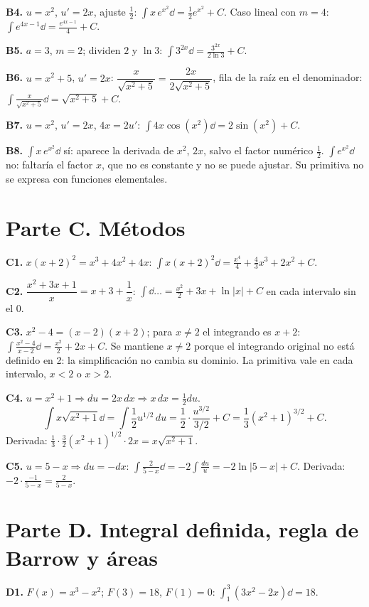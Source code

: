 \documentclass[11pt]{article}
\begin{document}
\textbf{B4.} \(u=x^2\), \(u'=2x\), ajuste \(\frac12\): \(\displaystyle\int x\,e^{x^2}\dd=\frac12e^{x^2}+C\). \quad Caso lineal con \(m=4\): \(\displaystyle\int e^{4x-1}\dd=\frac{e^{4x-1}}{4}+C.\)

\textbf{B5.} \(a=3\), \(m=2\); dividen \(2\) y \(\ln3\): \(\displaystyle\int3^{2x}\dd=\frac{3^{2x}}{2\ln3}+C.\)

\textbf{B6.} \(u=x^2+5\), \(u'=2x\): \(\dfrac{x}{\sqrt{x^2+5}}=\dfrac{2x}{2\sqrt{x^2+5}}\), fila de la raíz en el denominador: \(\displaystyle\int\frac{x}{\sqrt{x^2+5}}\dd=\sqrt{x^2+5}+C.\)

\textbf{B7.} \(u=x^2\), \(u'=2x\), \(4x=2u'\): \(\displaystyle\int4x\cos(x^2)\dd=2\sin(x^2)+C.\)

\textbf{B8.} \(\int x\,e^{x^2}\dd\) sí: aparece la derivada de \(x^2\), \(2x\), salvo el factor numérico \(\frac12\). \(\int e^{x^2}\dd\) no: faltaría el factor \(x\), que no es constante y no se puede ajustar. Su primitiva no se expresa con funciones elementales.

\section*{Parte C. Métodos}
\textbf{C1.} \(x(x+2)^2=x^3+4x^2+4x\): \(\displaystyle\int x(x+2)^2\dd=\frac{x^4}{4}+\frac43x^3+2x^2+C.\)

\textbf{C2.} \(\dfrac{x^2+3x+1}{x}=x+3+\dfrac1x\): \(\displaystyle\int\dd\ldots=\frac{x^2}{2}+3x+\ln|x|+C\) en cada intervalo sin el 0.

\textbf{C3.} \(x^2-4=(x-2)(x+2)\); para \(x\ne2\) el integrando es \(x+2\): \(\displaystyle\int\frac{x^2-4}{x-2}\dd=\frac{x^2}{2}+2x+C.\)
Se mantiene \(x\ne2\) porque el integrando original no está definido en 2: la simplificación no cambia su dominio. La primitiva vale en cada intervalo, \(x<2\) o \(x>2\).

\textbf{C4.} \(u=x^2+1\Rightarrow du=2x\,dx\Rightarrow x\,dx=\frac12du\).
\[\int x\sqrt{x^2+1}\dd=\int\frac12u^{1/2}\,du=\frac12\cdot\frac{u^{3/2}}{3/2}+C=\frac13(x^2+1)^{3/2}+C.\]
Derivada: \(\frac13\cdot\frac32(x^2+1)^{1/2}\cdot2x=x\sqrt{x^2+1}\).

\textbf{C5.} \(u=5-x\Rightarrow du=-dx\): \(\displaystyle\int\frac{2}{5-x}\dd=-2\int\frac{du}{u}=-2\ln|5-x|+C.\)
Derivada: \(-2\cdot\frac{-1}{5-x}=\frac{2}{5-x}\).

\section*{Parte D. Integral definida, regla de Barrow y áreas}
\textbf{D1.} \(F(x)=x^3-x^2\); \(F(3)=18\), \(F(1)=0\): \(\displaystyle\int_1^3(3x^2-2x)\dd=18.\)
\end{document}
